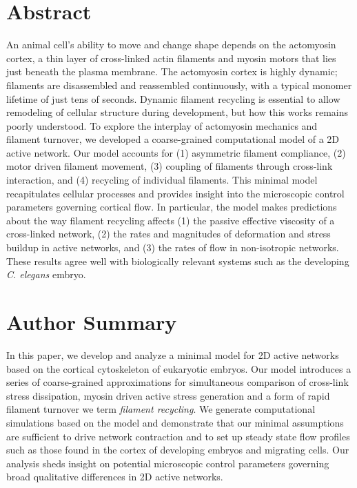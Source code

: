 \documentclass[10pt,letterpaper]{article}
\begin{document}
\section*{Abstract}
An animal cell's ability to move and change shape depends on the actomyosin cortex, a thin layer of cross-linked actin filaments and myosin motors that lies just beneath the plasma membrane.  The actomyosin cortex is highly dynamic; filaments are disassembled and reassembled continuously, with a typical monomer lifetime of just tens of seconds.  Dynamic filament recycling is essential to allow remodeling of cellular structure during development, but how this works remains poorly understood.  To explore the interplay of actomyosin mechanics and filament turnover, we developed a coarse-grained computational model of a 2D active network.  Our model accounts for (1) asymmetric filament compliance, (2) motor driven filament movement, (3) coupling of filaments through cross-link interaction, and (4) recycling of individual filaments.  This minimal model recapitulates cellular processes and provides insight into the microscopic control parameters governing cortical flow.  In particular, the model makes predictions about the way filament recycling affects (1) the passive effective viscosity of a cross-linked network, (2) the rates and magnitudes of deformation and stress buildup in active networks, and (3) the rates of flow in non-isotropic networks.  These results agree well with biologically relevant systems such as the developing \textit{C. elegans} embryo.


\section*{Author Summary}
In this paper, we develop and analyze a minimal model for 2D active networks based on the cortical cytoskeleton of eukaryotic embryos.  Our model introduces a series of coarse-grained approximations for simultaneous comparison of cross-link stress dissipation, myosin driven active stress generation and a form of rapid filament turnover we term {\em filament recycling}.  We generate computational simulations based on the model and demonstrate that our minimal assumptions are sufficient to drive network contraction and to set up steady state flow profiles such as those found in the cortex of developing embryos and migrating cells.  Our analysis sheds insight on potential microscopic control parameters governing broad qualitative differences in 2D active networks. 
\linenumbers
\end{document}
